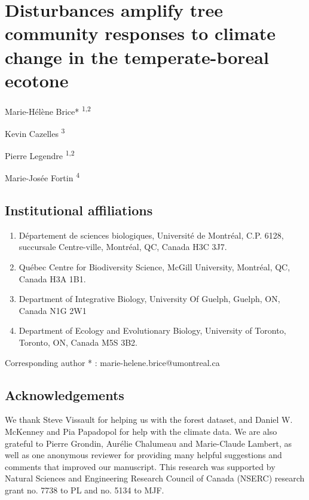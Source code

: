\documentclass[a4paperpaper,]{article}
\date{}
\providecommand{\tightlist}{%
  \setlength{\itemsep}{0pt}\setlength{\parskip}{0pt}}
\begin{document}
\hypertarget{disturbances-amplify-tree-community-responses-to-climate-change-in-the-temperate-boreal-ecotone}{%
\section{Disturbances amplify tree community responses to climate change
in the temperate-boreal
ecotone}\label{disturbances-amplify-tree-community-responses-to-climate-change-in-the-temperate-boreal-ecotone}}

Marie-Hélène Brice* \textsuperscript{1,2}

Kevin Cazelles \textsuperscript{3}

Pierre Legendre \textsuperscript{1,2}

Marie-Josée Fortin \textsuperscript{4}

\hypertarget{institutional-affiliations}{%
\subsection{Institutional
affiliations}\label{institutional-affiliations}}

\begin{enumerate}
\def\labelenumi{\arabic{enumi}.}
\tightlist
\item
  Département de sciences biologiques, Université de Montréal, C.P.
  6128, succursale Centre-ville, Montréal, QC, Canada H3C 3J7.
\item
  Québec Centre for Biodiversity Science, McGill University, Montréal,
  QC, Canada H3A 1B1.
\item
  Department of Integrative Biology, University Of Guelph, Guelph, ON,
  Canada N1G 2W1
\item
  Department of Ecology and Evolutionary Biology, University of Toronto,
  Toronto, ON, Canada M5S 3B2.
\end{enumerate}

Corresponding author * : marie-helene.brice@umontreal.ca

\hypertarget{acknowledgements}{%
\subsection{Acknowledgements}\label{acknowledgements}}

We thank Steve Vissault for helping us with the forest dataset, and
Daniel W. McKenney and Pia Papadopol for help with the climate data. We
are also grateful to Pierre Grondin, Aurélie Chalumeau and Marie-Claude
Lambert, as well as one anonymous reviewer for providing many helpful
suggestions and comments that improved our manuscript. This research was
supported by Natural Sciences and Engineering Research Council of Canada
(NSERC) research grant no. 7738 to PL and no. 5134 to MJF.
\end{document}

